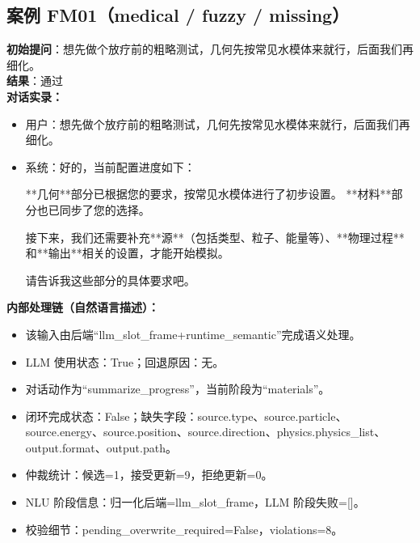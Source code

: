 \documentclass[11pt]{ctexart}
\begin{document}
\subsection{案例 FM01（medical / fuzzy / missing）}
\textbf{初始提问}：想先做个放疗前的粗略测试，几何先按常见水模体来就行，后面我们再细化。\\
\textbf{结果}：通过\\
\textbf{对话实录：}
\begin{itemize}
\item 用户：想先做个放疗前的粗略测试，几何先按常见水模体来就行，后面我们再细化。
\item 系统：好的，当前配置进度如下：

**几何**部分已根据您的要求，按常见水模体进行了初步设置。
**材料**部分也已同步了您的选择。

接下来，我们还需要补充**源**（包括类型、粒子、能量等）、**物理过程**和**输出**相关的设置，才能开始模拟。

请告诉我这些部分的具体要求吧。
\end{itemize}
\textbf{内部处理链（自然语言描述）：}
\begin{itemize}
\item 该输入由后端“llm\_slot\_frame+runtime\_semantic”完成语义处理。
\item LLM 使用状态：True；回退原因：无。
\item 对话动作为“summarize\_progress”，当前阶段为“materials”。
\item 闭环完成状态：False；缺失字段：source.type、source.particle、source.energy、source.position、source.direction、physics.physics\_list、output.format、output.path。
\item 仲裁统计：候选=1，接受更新=9，拒绝更新=0。
\item NLU 阶段信息：归一化后端=llm\_slot\_frame，LLM 阶段失败=[]。
\item 校验细节：pending\_overwrite\_required=False，violations=8。
\end{itemize}
\end{document}
